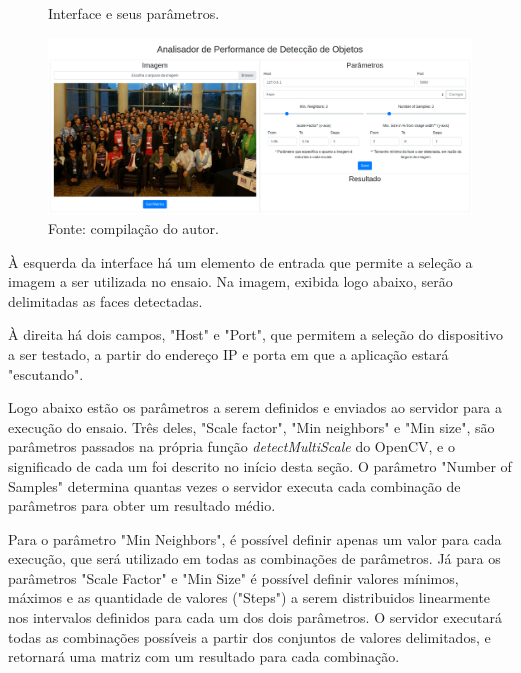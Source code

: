 \begin{figure}[h]
    \centering
    \caption[Interface e seus parâmetros.]{Interface e seus parâmetros.}
    \includegraphics[width=1.0\textwidth]{Cap3_Desenvolvimento/Figures/interface_parametros.png}
    \caption*{Fonte: compilação do autor.\footnotemark}
    \label{fig:interfaceUsuario}
\end{figure}



À esquerda da interface há um elemento de entrada que permite a seleção a imagem a ser utilizada no ensaio. Na imagem, exibida logo abaixo, serão delimitadas as faces detectadas.

À direita há dois campos, "Host" e "Port", que permitem a seleção do dispositivo a ser testado, a partir do endereço IP e porta em que a aplicação estará "escutando".

Logo abaixo estão os parâmetros a serem definidos e enviados ao servidor para a execução do ensaio. Três deles, "Scale factor", "Min neighbors" e "Min size", são parâmetros passados na própria função \textit{detectMultiScale} do OpenCV, e o significado de cada um foi descrito no início desta seção. O parâmetro "Number of Samples" determina quantas vezes o servidor executa cada combinação de parâmetros para obter um resultado médio.

Para o parâmetro "Min Neighbors", é possível definir apenas um valor para cada execução, que será utilizado em todas as combinações de parâmetros. Já para os parâmetros "Scale Factor" e "Min Size" é possível definir valores mínimos, máximos e as quantidade de valores ("Steps") a serem distribuidos linearmente nos intervalos definidos para cada um dos dois parâmetros. O servidor executará todas as combinações possíveis a partir dos conjuntos de valores delimitados, e retornará uma matriz com um resultado para cada combinação.

